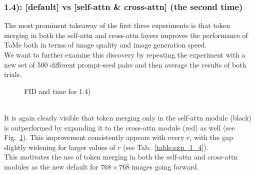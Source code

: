 \subsubsection*{1.4): [default] vs [self-attn \& cross-attn] (the second time)}
The most prominent takeaway of the first three experiments is that token merging in both the self-attn and cross-attn layers improves the performance of ToMe both in terms of image quality and image generation speed.\\
We want to further examine this discovery by repeating the experiment with a new set of 500 different prompt-seed pairs and then average the results of both trials.
\begin{figure}[!htb]
    
    
\caption{FID and time for 1.4)}
\label{fig:exp_1_4}
\end{figure}\\
It is again clearly visible that token merging only in the self-attn module (black) is outperformed by expanding it to the cross-attn module (red) as well (see Fig.~\ref{fig:exp_1_4}). This improvement consistently appears with every \(r\), with the gap slightly widening for larger values of \(r\) (see Tab.~\ref{table:exp_1_4}).\\
This motivates the use of token merging in both the self-attn and cross-attn modules as the new default for $768 \times 768$ images going forward.




